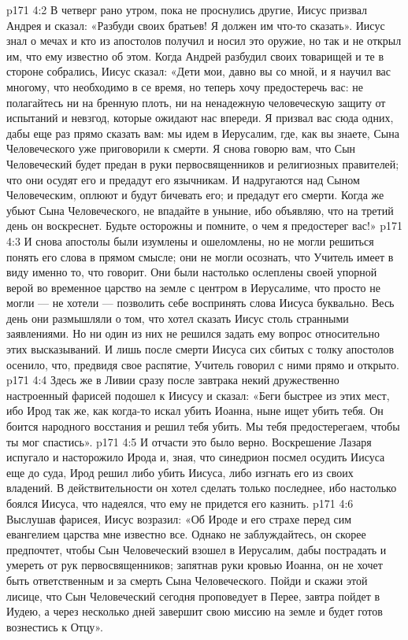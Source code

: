 \vs p171 4:2 В четверг рано утром, пока не проснулись другие, Иисус призвал Андрея и сказал: «Разбуди своих братьев! Я должен им что\hyp{}то сказать». Иисус знал о мечах и кто из апостолов получил и носил это оружие, но так и не открыл им, что ему известно об этом. Когда Андрей разбудил своих товарищей и те в стороне собрались, Иисус сказал: «Дети мои, давно вы со мной, и я научил вас многому, что необходимо в се время, но теперь хочу предостеречь вас: не полагайтесь ни на бренную плоть, ни на ненадежную человеческую защиту от испытаний и невзгод, которые ожидают нас впереди. Я призвал вас сюда одних, дабы еще раз прямо сказать вам: мы идем в Иерусалим, где, как вы знаете, Сына Человеческого уже приговорили к смерти. Я снова говорю вам, что Сын Человеческий будет предан в руки первосвященников и религиозных правителей; что они осудят его и предадут его язычникам. И надругаются над Сыном Человеческим, оплюют и будут бичевать его; и предадут его смерти. Когда же убьют Сына Человеческого, не впадайте в уныние, ибо объявляю, что на третий день он воскреснет. Будьте осторожны и помните, о чем я предостерег вас!»
\vs p171 4:3 И снова апостолы были изумлены и ошеломлены, но не могли решиться понять его слова в прямом смысле; они не могли осознать, что Учитель имеет в виду именно то, что говорит. Они были настолько ослеплены своей упорной верой во временное царство на земле с центром в Иерусалиме, что просто не могли --- не хотели --- позволить себе воспринять слова Иисуса буквально. Весь день они размышляли о том, что хотел сказать Иисус столь странными заявлениями. Но ни один из них не решился задать ему вопрос относительно этих высказываний. И лишь после смерти Иисуса сих сбитых с толку апостолов осенило, что, предвидя свое распятие, Учитель говорил с ними прямо и открыто.
\vs p171 4:4 \pc Здесь же в Ливии сразу после завтрака некий дружественно настроенный фарисей подошел к Иисусу и сказал: «Беги быстрее из этих мест, ибо Ирод так же, как когда\hyp{}то искал убить Иоанна, ныне ищет убить тебя. Он боится народного восстания и решил тебя убить. Мы тебя предостерегаем, чтобы ты мог спастись».
\vs p171 4:5 И отчасти это было верно. Воскрешение Лазаря испугало и насторожило Ирода и, зная, что синедрион посмел осудить Иисуса еще до суда, Ирод решил либо убить Иисуса, либо изгнать его из своих владений. В действительности он хотел сделать только последнее, ибо настолько боялся Иисуса, что надеялся, что ему не придется его казнить.
\vs p171 4:6 Выслушав фарисея, Иисус возразил: «Об Ироде и его страхе перед сим евангелием царства мне известно все. Однако не заблуждайтесь, он скорее предпочтет, чтобы Сын Человеческий взошел в Иерусалим, дабы пострадать и умереть от рук первосвященников; запятнав руки кровью Иоанна, он не хочет быть ответственным и за смерть Сына Человеческого. Пойди и скажи этой лисице, что Сын Человеческий сегодня проповедует в Перее, завтра пойдет в Иудею, а через несколько дней завершит свою миссию на земле и будет готов вознестись к Отцу».
